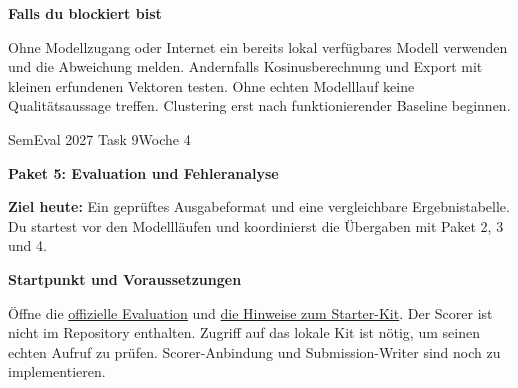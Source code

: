 \documentclass[10pt,a4paper]{article}
\newcommand{\planheading}[1]{\par\vspace{9pt}\textbf{#1}\par\vspace{3pt}}
\newcommand{\repolink}[2]{\href{https://github.com/jonaidaydi/semeval-2027-task9-framing/blob/main/#1}{#2}}
\newcommand{\followuptitle}[1]{%
  {\small SemEval 2027 Task 9\hfill Woche 4\par}%
  \vspace{6pt}%
  {\fontsize{16}{19}\selectfont\bfseries #1\par}%
  \vspace{8pt}%
}
\begin{document}
\planheading{Falls du blockiert bist}
Ohne Modellzugang oder Internet ein bereits lokal verfügbares Modell verwenden und die Abweichung melden.
Andernfalls Kosinusberechnung und Export mit kleinen erfundenen Vektoren testen.
Ohne echten Modelllauf keine Qualitätsaussage treffen. Clustering erst nach funktionierender Baseline beginnen.

\newpage
\hypertarget{plan-evaluation}{}
\followuptitle{Paket 5: Evaluation und Fehleranalyse}
\textbf{Ziel heute:} Ein geprüftes Ausgabeformat und eine vergleichbare Ergebnistabelle.
Du startest vor den Modellläufen und koordinierst die Übergaben mit Paket 2, 3 und 4.

\planheading{Startpunkt und Voraussetzungen}
Öffne die \href{https://propaganda.math.unipd.it/semeval2027task9/index.html}{offizielle Evaluation}
und \repolink{third_party/README.md}{die Hinweise zum Starter-Kit}.
Der Scorer ist nicht im Repository enthalten. Zugriff auf das lokale Kit ist nötig,
um seinen echten Aufruf zu prüfen. Scorer-Anbindung und Submission-Writer sind noch zu implementieren.
\end{document}
